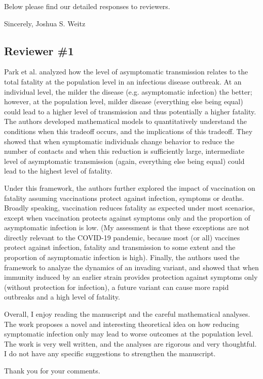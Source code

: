 \documentclass[12pt]{article}
\newcommand{\rev}{\subsection*}
\newcommand{\revtext}{\textsf}
\begin{document}
Below please find our detailed responses to reviewers.

Sincerely,
Joshua S. Weitz

\pagebreak

\rev{Reviewer \#1}

\revtext{Park et al. analyzed how the level of asymptomatic transmission relates to the total fatality at the population level in an infectious disease outbreak. At an individual level, the milder the disease (e.g. asymptomatic infection) the better; however, at the population level, milder disease (everything else being equal) could lead to a higher level of transmission and thus potentially a higher fatality. The authors developed mathematical models to quantitatively understand the conditions when this tradeoff occurs, and the implications of this tradeoff. They showed that when symptomatic individuals change behavior to reduce the number of contacts and when this reduction is sufficiently large, intermediate level of asymptomatic transmission (again, everything else being equal) could lead to the highest level of fatality.}

\revtext{Under this framework, the authors further explored the impact of vaccination on fatality assuming vaccinations protect against infection, symptoms or deaths. Broadly speaking, vaccination reduces fatality as expected under most scenarios, except when vaccination protects against symptoms only and the proportion of asymptomatic infection is low. (My assessment is that these exceptions are not directly relevant to the COVID-19 pandemic, because most (or all) vaccines protect against infection, fatality and transmission to some extent and the proportion of asymptomatic infection is high). Finally, the authors used the framework to analyze the dynamics of an invading variant, and showed that when immunity induced by an earlier strain provides protection against symptoms only (without protection for infection), a future variant can cause more rapid outbreaks and a high level of fatality.}

\revtext{Overall, I enjoy reading the manuscript and the careful mathematical analyses. The work proposes a novel and interesting theoretical idea on how reducing symptomatic infection only may lead to worse outcomes at the population level. The work is very well written, and the analyses are rigorous and very thoughtful. I do not have any specific suggestions to strengthen the manuscript.}

Thank you for your comments.
\end{document}

